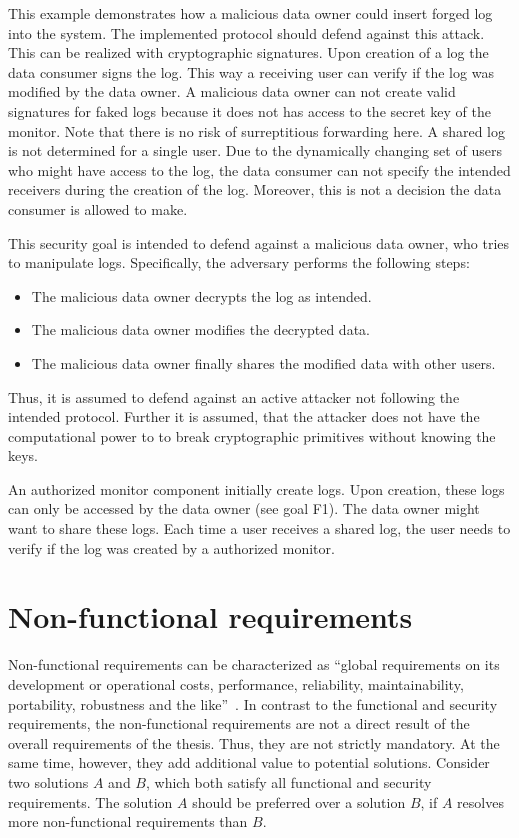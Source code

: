\documentclass[../main.tex]{subfiles}
\begin{document}
This example demonstrates how a malicious data owner could insert forged log into the system.
The implemented protocol should defend against this attack.
This can be realized with cryptographic signatures.
Upon creation of a log the data consumer signs the log.
This way a receiving user can verify if the log was modified by the data owner.
A malicious data owner can not create valid signatures for faked logs because it does not has access to the secret key of the monitor.
Note that there is no risk of surreptitious forwarding here.
A shared log is not determined for a single user. 
Due to the dynamically changing set of users who might have access to the log, the data consumer can not specify the intended receivers during the creation of the log.
Moreover, this is not a decision the data consumer is allowed to make.


This security goal is intended to defend against a malicious data owner, who tries to manipulate logs. 
Specifically, the adversary performs the following steps:
\begin{itemize}
    \item The malicious data owner decrypts the log as intended.
    \item The malicious data owner modifies the decrypted data.
    \item The malicious data owner finally shares the modified data with other users.
\end{itemize}
Thus, it is assumed to defend against an active attacker not following the intended protocol.
Further it is assumed, that the attacker does not have the computational power to to break cryptographic primitives without knowing the keys.

An authorized monitor component initially create logs. 
Upon creation, these logs can only be accessed by the data owner (see goal F1).
The data owner might want to share these logs.
Each time a user receives a shared log, the user needs to verify if the log was created by a authorized monitor.

\section{Non-functional requirements}\label{non-functional-requriements}
Non-functional requirements can be characterized as \enquote{global requirements on its development or operational costs, performance, reliability, maintainability, portability, robustness and the like}~\cite[11]{Mylopoulos1992}.
In contrast to the functional and security requirements, the non-functional requirements are not a direct result of the overall requirements of the thesis.
Thus, they are not strictly mandatory.
At the same time, however, they add additional value to potential solutions.
Consider two solutions $A$ and $B$, which both satisfy all functional and security requirements.
The solution $A$ should be preferred over a solution $B$, if $A$ resolves more non-functional requirements than $B$.
\end{document}
